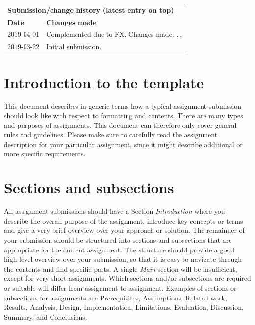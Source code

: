 \documentclass[12pt,a4paper]{article}
\begin{document}
\begin{small}
\begin{longtable}{|l|p{13.3cm}|}
\hline
\multicolumn{2}{|l|}{\textbf{Submission/change history (latest entry on top)}} \\
\textbf{Date} & \textbf{Changes made} \\
\hline
2019-04-01 & Complemented due to FX. Changes made: ... \\
\hline 
2019-03-22 & Initial submission. \\
\hline 
\end{longtable}
\end{small}


\newpage

\section{Introduction to the template}
\label{sec:intro}
This document describes in generic terms how a typical assignment submission should look like with respect to formatting and contents.
There are many types and purposes of assignments.
This document can therefore only cover general rules and guidelines.
Please make sure to carefully read the assignment description for your particular assignment, since it might describe additional or more specific requirements.


\section{Sections and subsections}
\label{sec:main}
All assignment submissions should have a Section \textit{Introduction} where you describe the overall purpose of the assignment, introduce key concepts or terms and give a very brief overview over your approach or solution. The remainder of your submission should be structured into sections and subsections that are appropriate for the current assignment. The structure should provide a good high-level overview over your submission, so that it is easy to navigate through the contents and find specific parts. A single \textit{Main}-section will be insufficient, except for very short assignments.
Which sections and/or subsections are required or suitable will differ from assignment to assignment. Examples of sections or subsections for assignments are Prerequisites, Assumptions, Related work, Results, Analysis, Design, Implementation, Limitations, Evaluation, Discussion, Summary, and Conclusions.
\end{document}
